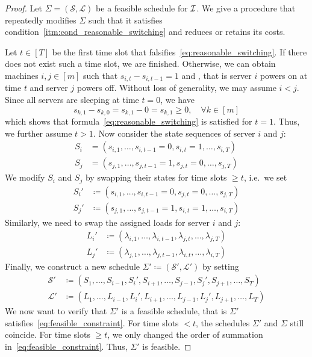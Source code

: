\begin{proof}
Let $\Sigma=(\mathcal{S},\mathcal{L})$ be a feasible schedule for $\mathcal{I}$. We give a procedure that repeatedly modifies $\Sigma$ such that it satisfies condition~\eqref{itm:cond_reasonable_switching} and reduces or retains its costs. 
	
Let $t\in[T]$ be the first time slot that falsifies~\eqref{eq:reasonable_switching}. If there does not exist such a time slot, we are finished. Otherwise, we can obtain machines $i,j\in[m]$ such that $s_{i,t}-s_{i,t-1}=1$ and , that is server $i$ powers on at time $t$ and server $j$ powers off. Without loss of generality, we may assume $i<j$. Since all servers are sleeping at time $t=0$, we have
\begin{equation*}
	s_{k,1}-s_{k,0}=s_{k,1}-0=s_{k,1}\ge 0,\quad\forall k\in[m]
\end{equation*}
which shows that formula~\eqref{eq:reasonable_switching} is satisfied for $t=1$. Thus, we further assume $t>1$. Now consider the state sequences of server $i$ and $j$:
\begin{align*}
	S_i&=(s_{i,1},\dotsc,s_{i,t-1}=0,s_{i,t}=1,\dotsc,s_{i,T})\\
	S_j&=(s_{j,1},\dotsc,s_{j,t-1}=1,s_{j,t}=0,\dotsc,s_{j,T})
\end{align*}
We modify $S_i$ and $S_j$ by swapping their states for time slots $\ge t$, i.e.\ we set
\begin{align*}
	S_i'&\coloneqq(s_{i,1},\dotsc,s_{i,t-1}=0,s_{j,t}=0,\dotsc,s_{j,T})\\
	S_j'&\coloneqq(s_{j,1},\dotsc,s_{j,t-1}=1,s_{i,t}=1,\dotsc,s_{i,T})
\end{align*}
Similarly, we need to swap the assigned loads for server $i$ and $j$:
\begin{align*}
	L_i'&\coloneqq(\lambda_{i,1},\dotsc,\lambda_{i,t-1},\lambda_{j,t},\dotsc,\lambda_{j,T})\\
	L_j'&\coloneqq(\lambda_{j,1},\dotsc,\lambda_{j,t-1},\lambda_{i,t},\dotsc,\lambda_{i,T})
\end{align*}
Finally, we construct a new schedule $\Sigma'\coloneqq(\mathcal{S}',\mathcal{L}')$ by setting
\begin{align*}
	\mathcal{S}'&\coloneqq(S_1,\dotsc,S_{i-1},S_i',S_{i+1},\dotsc,S_{j-1},S_j',S_{j+1},\dotsc,S_T)\\
	\mathcal{L}'&\coloneqq(L_1,\dotsc,L_{i-1},L_i',L_{i+1},\dotsc,L_{j-1},L_j',L_{j+1},\dotsc,L_T)
\end{align*}
We now want to verify that $\Sigma'$ is a feasible schedule, that is $\Sigma'$ satisfies~\eqref{eq:feasible_constraint}. For time slots $<t$, the schedules $\Sigma'$ and $\Sigma$ still coincide. For time slots $\ge t$, we only changed the order of summation in~\eqref{eq:feasible_constraint}. Thus, $\Sigma'$ is feasible.


\end{proof}
